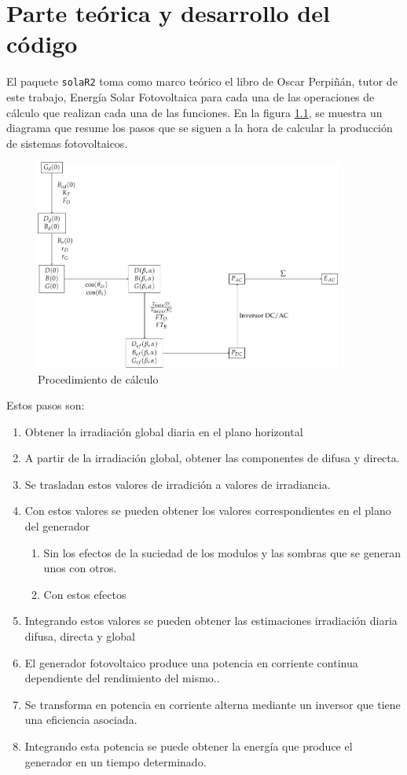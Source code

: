\chapter{Parte teórica y desarrollo del código}
El paquete \texttt{solaR2} toma como marco teórico el libro de Oscar Perpiñán, tutor de este trabajo, Energía Solar Fotovoltaica \cite{Perpinan2023} para cada una de las operaciones de cálculo que realizan cada una de las funciones.
En la figura \ref{fig:orgbd45819}, se muestra un diagrama que resume los pasos que se siguen a la hora de calcular la producción de sistemas fotovoltaicos.
\begin{figure}[p]
\centering
\includegraphics[keepaspectratio,width=0.9\textwidth,height=0.5\textheight]{figuras/ProcedimientoCalculoRadiacionInclinada.pdf}
\caption{\label{fig:orgbd45819}Procedimiento de cálculo}
\end{figure}
Estos pasos son:
\begin{enumerate}
\item Obtener la irradiación global diaria en el plano horizontal
\item A partir de la irradiación global, obtener las componentes de difusa y directa.
\item Se trasladan estos valores de irradición a valores de irradiancia.
\item Con estos valores se pueden obtener los valores correspondientes en el plano del generador
\begin{enumerate}
\item Sin los efectos de la suciedad de los modulos y las sombras que se generan unos con otros.
\item Con estos efectos
\end{enumerate}
\item Integrando estos valores se pueden obtener las estimaciones irradiación diaria difusa, directa y global
\item El generador fotovoltaico produce una potencia en corriente continua dependiente del rendimiento del mismo..
\item Se transforma en potencia en corriente alterna mediante un inversor que tiene una eficiencia asociada.
\item Integrando esta potencia se puede obtener la energía que produce el generador en un tiempo determinado.
\end{enumerate}
